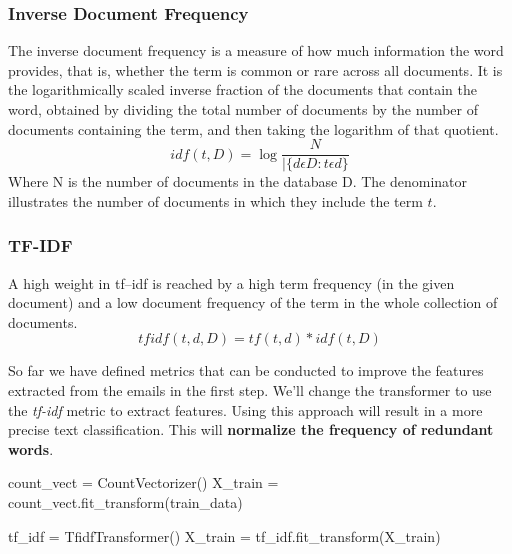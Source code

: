 \documentclass[12pt]{article}
\numberwithin{equation}{section}
\numberwithin{table}{section}
\numberwithin{figure}{section}
\begin{document}
\subsubsection{Inverse Document Frequency}
The inverse document frequency is a measure of how much information the word provides, that is, whether the term is common or rare across all documents. It is the logarithmically scaled inverse fraction of the documents that contain the word, obtained by dividing the total number of documents by the number of documents containing the term, and then taking the logarithm of that quotient.
$$
	idf(t, D) = \log \frac{N}{|\{d \epsilon D: t \epsilon d\}}
$$
Where N is the number of documents in the database D. The denominator illustrates the number of documents in which they include the term $t$.

\subsubsection{TF-IDF}
A high weight in tf–idf is reached by a high term frequency (in the given document) and a low document frequency of the term in the whole collection of documents.
$$
	tfidf(t, d, D) = tf(t, d) * idf(t, D)
$$

So far we have defined metrics that can be conducted to improve the features extracted from the emails in the first step. We'll change the transformer to use the \textit{tf-idf} metric to extract features. Using this approach will result in a more precise text classification. This will \textbf{normalize the frequency of redundant words}.
\begin{python}
	count_vect = CountVectorizer()
	X_train = count_vect.fit_transform(train_data)
	
	tf_idf = TfidfTransformer()
	X_train = tf_idf.fit_transform(X_train)
\end{python}
\end{document}
